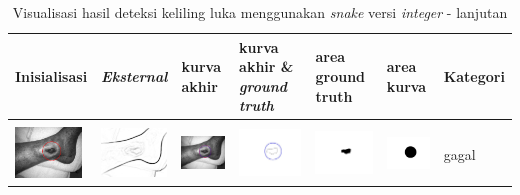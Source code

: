 \begin{table}[H]
	\centering
	\caption{Visualisasi hasil deteksi keliling luka menggunakan \emph{snake} versi \emph{integer} - lanjutan}
	\label{tabel_hasil_8}
	\begin{tabular}{|m{0.7in}|m{0.7in}|m{0.7in}|m{0.7in}|m{0.7in}|m{0.7in}|m{0.7in}|}
		\hline
		\textbf{Inisialisasi} & \textbf{\emph{Eksternal}} & \textbf{kurva akhir} & \textbf{kurva akhir \& \emph{ground truth}}& \textbf{area ground truth} & \textbf{area kurva} & \textbf{Kategori} \\
		\hline
		
		&  &  & & & &  \\
		\includegraphics[width=0.7in]{dataset/dataset_3/luka_merah/ready/18_integer_init.jpg}&
		\includegraphics[width=0.7in]{dataset/dataset_3/luka_merah/ready/18_integer_ext.jpg}&
		\includegraphics[width=0.7in]{dataset/dataset_3/luka_merah/ready/18_integer_result.jpg}&
		\includegraphics[width=0.7in]{dataset/dataset_3/luka_merah/ready/18_gt_r_integer.jpg}&
		\includegraphics[width=0.7in]{dataset/dataset_3/luka_merah/ready/18_r.jpg}&
		\includegraphics[width=0.7in]{dataset/dataset_3/luka_merah/ready/18_integer_r.jpg}&
		gagal\\
		\hline
		

\end{tabular}
\end{table}
